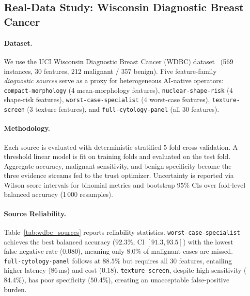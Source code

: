 \documentclass[runningheads]{llncs}
\begin{document}
\subsection{Real-Data Study: Wisconsin Diagnostic Breast Cancer}
\label{sec:wdbc}

\paragraph{Dataset.}
We use the UCI Wisconsin Diagnostic Breast Cancer (WDBC)
dataset~\cite{street1993nuclear} (569 instances, 30 features, 212
malignant / 357 benign).  Five feature-family \emph{diagnostic sources}
serve as a proxy for heterogeneous AI-native operators:
\texttt{compact-morphology} (4 mean-morphology features),
\texttt{nuclear-shape-risk} (4 shape-risk features),
\texttt{worst-case-specialist} (4 worst-case features),
\texttt{texture-screen} (3 texture features), and
\texttt{full-cytology-panel} (all 30 features).

\paragraph{Methodology.}
Each source is evaluated with deterministic stratified 5-fold
cross-validation.  A threshold linear model is fit on training folds
and evaluated on the test fold.  Aggregate accuracy, malignant
sensitivity, and benign specificity become the three evidence streams
fed to the trust optimizer.  Uncertainty is reported via Wilson score
intervals for binomial metrics and bootstrap 95\% CIs over fold-level
balanced accuracy (1\,000 resamples).

\paragraph{Source Reliability.}
Table~\ref{tab:wdbc_sources} reports reliability statistics.
\texttt{worst-case-specialist} achieves the best balanced accuracy
($92.3\%$, CI $[91.3, 93.5]$) with the lowest false-negative rate
(0.080), meaning only 8.0\% of malignant cases are missed.
\texttt{full-cytology-panel} follows at $88.5\%$ but requires all 30
features, entailing higher latency (86\,ms) and cost (0.18).
\texttt{texture-screen}, despite high sensitivity ($84.4\%$), has poor
specificity ($50.4\%$), creating an unacceptable false-positive burden.
\end{document}
